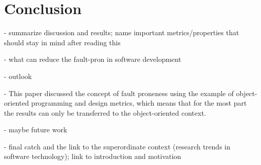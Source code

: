 \section{Conclusion}\label{conclusion}

- summarize discussion and results; name important metrics/properties that should stay in mind after reading this

- what can reduce the fault-pron in software development

- outlook

- This paper discussed the concept of fault proneness using the example of object-oriented programming and design metrics, which means that for the most part the results can only be transferred to the object-oriented context.

- maybe future work

- final catch and the link to the superordinate context (research trends in software technology); link to introduction and motivation